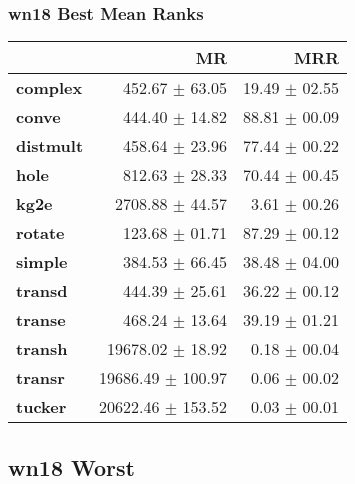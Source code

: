 \documentclass{article}
\begin{document}
\subsubsection{wn18 Best Mean Ranks}
    \begin{center}
    \begin{tabular}{lrr}
\toprule
{} &                 MR &            MRR \\
\midrule
\textbf{complex } &     452.67 $\pm$ 63.05 &  19.49 $\pm$ 02.55 \\
\textbf{conve   } &     444.40 $\pm$ 14.82 &  88.81 $\pm$ 00.09 \\
\textbf{distmult} &     458.64 $\pm$ 23.96 &  77.44 $\pm$ 00.22 \\
\textbf{hole    } &     812.63 $\pm$ 28.33 &  70.44 $\pm$ 00.45 \\
\textbf{kg2e    } &    2708.88 $\pm$ 44.57 &   3.61 $\pm$ 00.26 \\
\textbf{rotate  } &     123.68 $\pm$ 01.71 &  87.29 $\pm$ 00.12 \\
\textbf{simple  } &     384.53 $\pm$ 66.45 &  38.48 $\pm$ 04.00 \\
\textbf{transd  } &     444.39 $\pm$ 25.61 &  36.22 $\pm$ 00.12 \\
\textbf{transe  } &     468.24 $\pm$ 13.64 &  39.19 $\pm$ 01.21 \\
\textbf{transh  } &   19678.02 $\pm$ 18.92 &   0.18 $\pm$ 00.04 \\
\textbf{transr  } &  19686.49 $\pm$ 100.97 &   0.06 $\pm$ 00.02 \\
\textbf{tucker  } &  20622.46 $\pm$ 153.52 &   0.03 $\pm$ 00.01 \\
\bottomrule
\end{tabular}

    \end{center}
\subsection{wn18 Worst}
\end{document}
